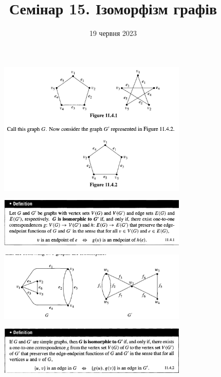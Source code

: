 \documentclass{article}
\begin{document}
\title{Семінар 15. Ізоморфізм графів}
\date{19 червня 2023}

\maketitle

\begin{figure}[ht!]
\centering
\includegraphics[width=90mm]{1}
\end{figure}

\begin{figure}
\centering
\includegraphics[width=90mm]{2}
\end{figure}

\begin{figure}
\centering
\includegraphics[width=90mm]{3}
\end{figure}

\begin{figure}
\centering
\includegraphics[width=90mm]{4}
\end{figure}
\end{document}
